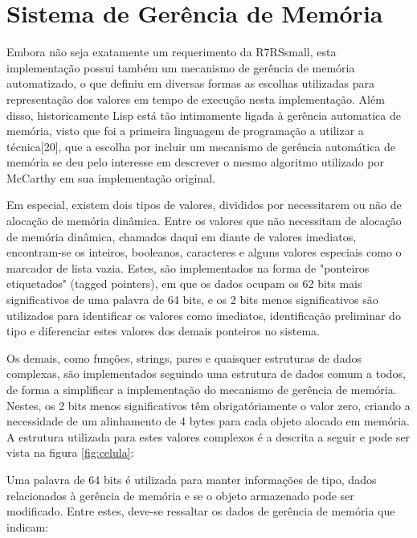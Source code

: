 \section{Sistema de Gerência de Memória}
\label{sec:memoria}

Embora não seja exatamente um requerimento da R7RSsmall, esta implementação
possui também um mecanismo de gerência de memória automatizado, o que definiu
em diversas formas as escolhas utilizadas para representação dos valores em
tempo de execução nesta implementação. Além disso, historicamente Lisp está tão
intimamente ligada à gerência automatica de memória, visto que foi a primeira
linguagem de programação a utilizar a técnica[20], que a escolha por incluir um
mecanismo de gerência automática de memória se deu pelo interesse em descrever
o mesmo algoritmo utilizado por McCarthy em sua implementação original.

Em especial, existem dois tipos de valores, divididos por necessitarem ou não
de alocação de memória dinâmica. Entre os valores que não necessitam de
alocação de memória dinâmica, chamados daqui em diante de valores imediatos,
encontram-se os inteiros, booleanos, caracteres e alguns valores especiais como
o marcador de lista vazia. Estes, são implementados na forma de "ponteiros
etiquetados" (tagged pointers), em que os dados ocupam os 62 bits mais
significativos de uma palavra de 64 bits, e os 2 bits menos significativos são
utilizados para identificar os valores como imediatos, identificação preliminar
do tipo e diferenciar estes valores dos demais ponteiros no sistema.

Os demais, como funções, strings, pares e quaisquer estruturas de dados
complexas, são implementados seguindo uma estrutura de dados comum a todos, de
forma a simplificar a implementação do mecanismo de gerência de memória.
Nestes, os 2 bits menos significativos têm obrigatóriamente o valor zero,
criando a necessidade de um alinhamento de 4 bytes para cada objeto alocado em
memória. A estrutura utilizada para estes valores complexos é a descrita a
seguir e pode ser vista na figura \ref{fig:celula}:

Uma palavra de 64 bits é utilizada para manter informações de tipo, dados
relacionados à gerência de memória e se o objeto armazenado pode ser
modificado. Entre estes, deve-se ressaltar os dados de gerência de memória que
indicam:

